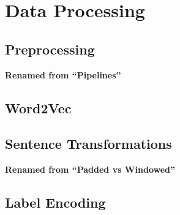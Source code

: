 \section{Data Processing}
\label{sec:data_processing}

  \subsection{Preprocessing}
  \label{sec:preprocessing}
    \textbf{Renamed from ``Pipelines''}

  \subsection{Word2Vec}
  \label{sec:word2vec}

  \subsection{Sentence Transformations}
  \label{sec:sentence_transformations}
    \textbf{Renamed from ``Padded vs Windowed''}

  \subsection{Label Encoding}
  \label{sec:label_encoding}
  